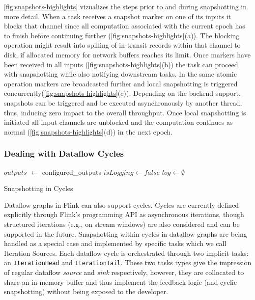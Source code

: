  \autoref{fig:snapshots-highlights} vizualizes the steps prior to and during snapshotting in more detail. When a task receives a snapshot marker on one of its inputs it blocks that channel since all computation associated with the current epoch has to finish before continuing further (\autoref{fig:snapshots-highlights}(a)). The blocking operation might result into spilling of in-transit records within that channel to disk, if allocated memory for network buffers reaches its limit. Once markers have been received in all inputs (\autoref{fig:snapshots-highlights}(b)) the task can proceed with snapshotting while also notifying downstream tasks. In the same atomic operation markers are broadcasted further and local snapshotting is triggered concurrently(\autoref{fig:snapshots-highlights}(c)). Depending on the backend support, snapshots can be triggered and be executed asynchronously by another thread, thus, inducing zero impact to the overall throughput. Once local snapshotting is initiated all input channels are unblocked and the computation continues as normal (\autoref{fig:snapshots-highlights}(d)) in the next epoch.

\subsubsection{Dealing with Dataflow Cycles}

\begin{algorithm}
$outputs$ $\leftarrow$ configured\_outputs\;
$isLogging \leftarrow false$ \;
$log \leftarrow \emptyset$ \;

\caption{Snapshotting in Cycles}
\label{alg:snapcycle}
\end{algorithm}


Dataflow graphs in Flink can also support cycles. Cycles are currently defined explicitly through Flink's programming API as asynchronous iterations, though structured iterations (e.g., on stream windows) are also considered and can be supported in the future. Snapshotting within cycles in dataflow graphs are being handled as a special case and implemented by specific tasks which we call Iteration Sources. Each dataflow cycle is orchestrated through two implicit tasks: an \texttt{IterationHead} and \texttt{IterationTail}. These two tasks types give the impression of regular dataflow \emph{source} and \emph{sink} respectively, however, they are collocated to share an in-memory buffer and thus implement the feedback logic (and cyclic snapshotting) without being exposed to the developer.

